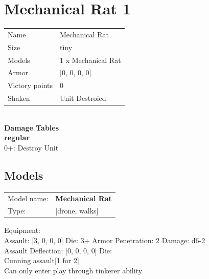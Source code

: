 \clearpage

\section{ Mechanical Rat 1 }

\begin{tabular}{ll}
  Name & Mechanical Rat \\
  Size & tiny\\
  Models & 1 x Mechanical Rat\\
  Armor & [0, 0, 0, 0]\\
  Victory points & 0\\
  Shaken & Unit Destroied\\
\end{tabular}

\\ 



{\bf Damage Tables} \\
 {\bf regular } \\
0+: Destroy Unit \\


\clearpage

\subsection{ Models }

\begin{tabular}{ll}
Model name: & {\bf Mechanical Rat } \\
Type: & [drone, walks] \\
\end{tabular}

Equipment:  \\

Assault: [3, 0, 0, 0] Die: 3+ Armor Penetration: 2 Damage: d6-2 \\
Assault Deflection: [0, 0, 0, 0] Die: \\
\indent Cunning assault[1 for 2]\\ 
 

Can only enter play through tinkerer ability\\ 


 















